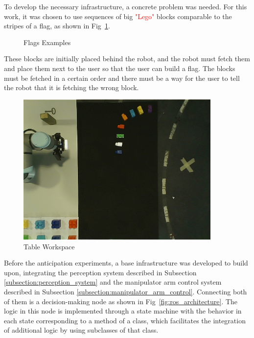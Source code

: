 To develop the necessary infrastructure, a concrete problem was needed. For this work, it was chosen to use sequences of big \textcolor{red}{"Lego"} blocks comparable to the stripes of a flag, as shown in Fig~\ref{fig:flags_examples}.

\begin{figure}[H]%
    \centering
    
    \caption{Flags Examples}
    \label{fig:flags_examples}
\end{figure}

These blocks are initially placed behind the robot, and the robot must fetch them and place them next to the user so that the user can build a flag. The blocks must be fetched in a certain order and there must be a way for the user to tell the robot that it is fetching the wrong block.

\begin{figure}[h]
\centerline{\includegraphics[width=0.9\textwidth]{figs/table_workspace.png}}
\caption[Table Workspace]{Table Workspace}
\label{fig:table_workspace}
\end{figure}

Before the anticipation experiments, a base infrastructure was developed to build upon, integrating the perception system described in Subsection \ref{subsection:perception_system} and the manipulator arm control system described in Subsection \ref{subsection:manipulator_arm_control}. Connecting both of them is a decision-making node as shown in Fig~\ref{fig:ros_architecture}. The logic in this node is implemented through a state machine with the behavior in each state corresponding to a method of a class, which facilitates the integration of additional logic by using subclasses of that class.

